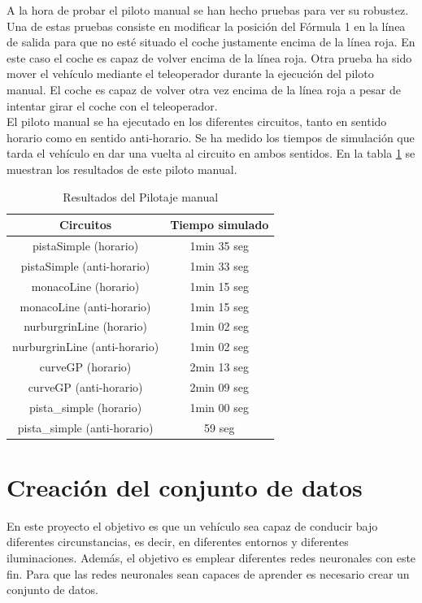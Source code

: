 A la hora de probar el piloto manual se han hecho pruebas para ver su robustez. Una de estas pruebas consiste en modificar la posición del Fórmula 1 en la línea de salida para que no esté situado el coche justamente encima de la línea roja. En este caso el coche es capaz de volver encima de la línea roja. Otra prueba ha sido mover el vehículo mediante el teleoperador durante la ejecución del piloto manual. El coche es capaz de volver otra vez encima de la línea roja a pesar de intentar girar el coche con el teleoperador.\\

El piloto manual se ha ejecutado en los diferentes circuitos, tanto en sentido horario como en sentido anti-horario. Se ha medido los tiempos de simulación que tarda el vehículo en dar una vuelta al circuito en ambos sentidos. En la tabla \ref{tabla_piloto} se muestran los resultados de este piloto manual.\\


\begin{table}[]
\centering
\caption{Resultados del Pilotaje manual}
\label{tabla_piloto}
\begin{tabular}{| c| c |}
\hline
Circuitos & Tiempo simulado \\
\hline \hline
pistaSimple (horario) & 1min 35 seg \\ \hline
pistaSimple (anti-horario) & 1min 33 seg \\ \hline
monacoLine (horario) & 1min 15 seg \\ \hline
monacoLine (anti-horario) & 1min 15 seg \\ \hline
nurburgrinLine (horario) & 1min 02 seg \\ \hline
nurburgrinLine (anti-horario) & 1min 02 seg \\ \hline
curveGP (horario) & 2min 13 seg \\ \hline
curveGP (anti-horario) & 2min 09 seg \\ \hline
pista\_simple (horario) & 1min 00 seg \\ \hline
pista\_simple (anti-horario) & 59 seg \\ \hline
\end{tabular}
\end{table}


\section{Creación del conjunto de datos}\label{dataset}

En este proyecto el objetivo es que un vehículo sea capaz de conducir bajo diferentes circunstancias, es decir, en diferentes entornos y diferentes iluminaciones. Además, el objetivo es emplear diferentes redes neuronales con este fin. Para que las redes neuronales sean capaces de aprender es necesario crear un conjunto de datos.\\

